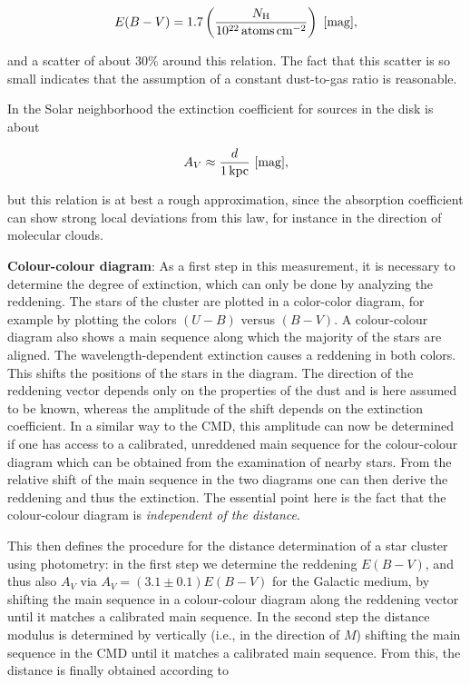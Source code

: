 \documentclass[a4paper,10pt]{article}
\begin{document}
\begin{align*}
    E(B-V) = 1.7 \left(\frac{N_\mathrm{H}}{10^{22}\,{\rm atoms\,cm^{-2}}}\right) ~ [{\rm mag}],
\end{align*}

{\noindent}and a scatter of about 30\% around this relation. The fact that this scatter is so small indicates that the assumption of a constant dust-to-gas ratio is reasonable.

{\noindent}In the Solar neighborhood the extinction coefficient for sources in the disk is about

\begin{align*}
    A_V \approx \frac{d}{1\,{\rm kpc}} ~ [{\rm mag}],
\end{align*}

{\noindent}but this relation is at best a rough approximation, since the absorption coefficient can show strong local deviations from this law, for instance in the direction of molecular clouds.

{\noindent}\textbf{Colour-colour diagram}: As a first step in this measurement, it is necessary to determine the degree of extinction, which can only be done by analyzing the reddening. The stars of the cluster are plotted in a color-color diagram, for example by plotting the colors $(U-B)$ versus $(B-V)$. A colour-colour diagram also shows a main sequence along which the majority of the stars are aligned. The wavelength-dependent extinction causes a reddening in both colors. This shifts the positions of the stars in the diagram. The direction of the reddening vector depends only on the properties of the dust and is here assumed to be known, whereas the amplitude of the shift depends on the extinction coefficient. In a similar way to the CMD, this amplitude can now be determined if one has access to a calibrated, unreddened main sequence for the colour-colour diagram which can be obtained from the examination of nearby stars. From the relative shift of the main sequence in the two diagrams one can then derive the reddening and thus the extinction. The essential point here is the fact that the colour-colour diagram is \textit{independent of the distance}.

{\noindent}This then defines the procedure for the distance determination of a star cluster using photometry: in the first step we determine the reddening $E(B-V)$, and thus also $A_V$ via $A_V=(3.1\pm0.1)E(B-V)$ for the Galactic medium, by shifting the main sequence in a colour-colour diagram along the reddening vector until it matches a calibrated main sequence. In the second step the distance modulus is determined by vertically (i.e., in the direction of $M$) shifting the main sequence in the CMD until it matches a calibrated main sequence. From this, the distance is finally obtained according to
\end{document}
